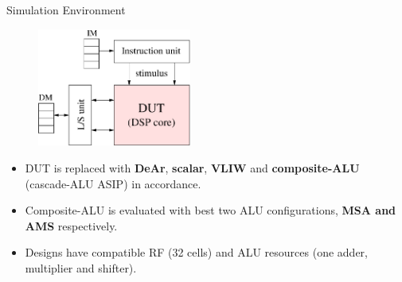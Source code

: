 \documentclass[handout]{beamer}
\begin{document}
\begin{CJK}{UTF8}{bkai}
            \begin{frame}{Simulation Environment}
                \begin{figure}[!ht] 
                    \centering
                    \includegraphics[width=0.45\textwidth]{./figs/sim.eps}
                \end{figure}
                \begin{itemize}
                    \item <2->{DUT is replaced with \textbf{DeAr}, \textbf{scalar}, \textbf{VLIW} and \textbf{composite-ALU} (cascade-ALU ASIP) in accordance.}
                    \item <3->{Composite-ALU is evaluated with best two ALU configurations, \textbf{MSA and AMS} respectively.}
                    \item <4->{Designs have compatible RF (32 cells) and ALU resources (one adder, multiplier and shifter).}
                \end{itemize}
            \end{frame}



\end{CJK}
\end{document}
